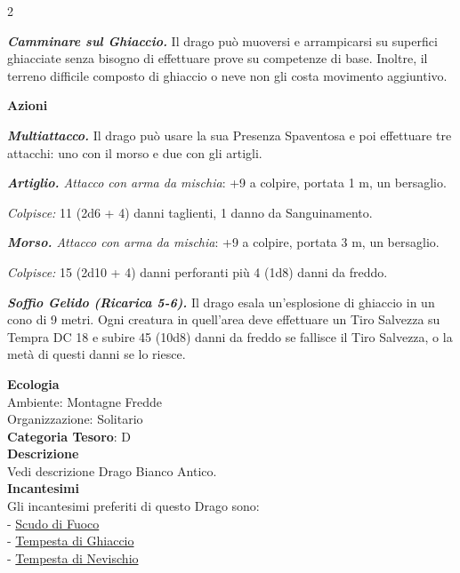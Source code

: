 \begin{multicols}{2}
{\emph{\textbf{Camminare sul Ghiaccio.}} Il drago può muoversi e arrampicarsi su superfici ghiacciate senza bisogno di effettuare prove su competenze di base. Inoltre, il terreno difficile composto di ghiaccio o neve non gli costa movimento aggiuntivo.

\textbf{Azioni}

\emph{\textbf{Multiattacco.}} Il drago può usare la sua Presenza Spaventosa e poi effettuare tre attacchi: uno con il morso e due con gli artigli.

\emph{\textbf{Artiglio.} Attacco con arma da mischia}: +9 a colpire, portata 1 m, un bersaglio.

\emph{Colpisce:} 11 (2d6 + 4) danni taglienti, 1 danno da Sanguinamento.

\emph{\textbf{Morso.} Attacco con arma da mischia}: +9 a colpire, portata 3 m, un bersaglio.

\emph{Colpisce:} 15 (2d10 + 4) danni perforanti più 4 (1d8) danni da freddo.

\emph{\textbf{Soffio Gelido (Ricarica 5-6).}} Il drago esala un'esplosione di ghiaccio in un cono di 9 metri. Ogni creatura in quell'area deve effettuare un Tiro Salvezza su Tempra DC 18 e subire 45 (10d8) danni da freddo se fallisce il Tiro Salvezza, o la metà di questi danni se lo riesce.

\textbf{Ecologia}\\
Ambiente: Montagne Fredde\\
Organizzazione: Solitario\\
\textbf{Categoria Tesoro}: D\\
\textbf{Descrizione}\\
Vedi descrizione Drago Bianco Antico.\\
\textbf{Incantesimi}\\
Gli incantesimi preferiti di questo Drago sono:\\
- \hyperlink{Scudo di Fuoco}{Scudo di Fuoco}\\
- \hyperlink{Tempesta di Ghiaccio}{Tempesta di Ghiaccio}\\
- \hyperlink{Tempesta di Nevischio}{Tempesta di Nevischio}

}
\end{multicols}
